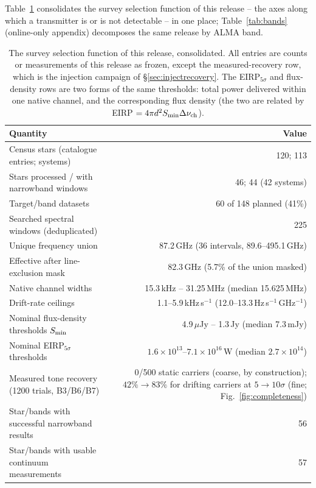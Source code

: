 \documentclass{openjournal}
\begin{document}
Table~\ref{tab:searchspace} consolidates the survey selection function
of this release -- the axes along which a transmitter is or is not
detectable -- in one place; Table~\ref{tab:bands} (online-only
appendix) decomposes the same release by ALMA band.

\begin{table}
\centering
\small
\setlength{\tabcolsep}{4pt}
\caption{The survey selection function of this release, consolidated.
All entries are counts or measurements of this release as frozen,
except the measured-recovery row, which is the injection campaign of
\S\ref{sec:injectrecovery}. The
EIRP$_{5\sigma}$ and flux-density rows are two forms of the same
thresholds: total power delivered within one native channel, and the
corresponding flux density (the two are related by
EIRP $= 4\pi d^{2} S_{\rm min} \Delta\nu_{\rm ch}$).}
\label{tab:searchspace}
\begin{tabular}{@{}l r@{}}
\hline
Quantity & Value \\
\hline
Census stars (catalogue entries; systems) & 120; 113 \\
Stars processed / with narrowband windows & 46; 44 (42 systems) \\
Target/band datasets & 60 of 148 planned (41\%) \\
Searched spectral windows (deduplicated) & 225 \\
Unique frequency union & 87.2\,GHz (36 intervals, 89.6--495.1\,GHz) \\
Effective after line-exclusion mask & 82.3\,GHz (5.7\% of the union masked) \\
Native channel widths & 15.3\,kHz -- 31.25\,MHz (median 15.625\,MHz) \\
Drift-rate ceilings & 1.1--5.9\,kHz\,s$^{-1}$ (12.0--13.3\,Hz\,s$^{-1}$\,GHz$^{-1}$) \\
Nominal flux-density thresholds $S_{\rm min}$ & 4.9\,$\mu$Jy -- 1.3\,Jy (median 7.3\,mJy) \\
Nominal EIRP$_{5\sigma}$ thresholds & $1.6\times10^{13}$--$7.1\times10^{16}$\,W (median $2.7\times10^{14}$) \\
Measured tone recovery (1200 trials, B3/B6/B7) & 0/500 static carriers (coarse, by construction); $42\%\rightarrow83\%$ for drifting carriers at $5\rightarrow10\sigma$ (fine; Fig.~\ref{fig:completeness}) \\
Star/bands with successful narrowband results & 56 \\
Star/bands with usable continuum measurements & 57 \\

\end{tabular}
\end{table}
\end{document}
